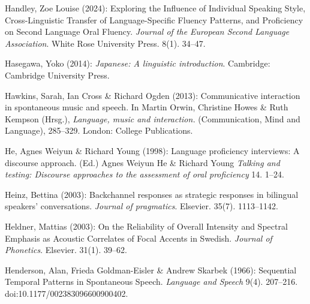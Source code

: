 \begin{styleBibliography}
Handley, Zoe Louise (2024): Exploring the Influence of Individual Speaking Style, Cross-Linguistic Transfer of Language-Specific Fluency Patterns, and Proficiency on Second Language Oral Fluency. \textit{Journal of the European Second Language Association}. White Rose University Press. 8(1). 34–47.
\end{styleBibliography}

\begin{styleBibliography}
Hasegawa, Yoko (2014): \textit{Japanese: A linguistic introduction}. Cambridge: Cambridge University Press.
\end{styleBibliography}

\begin{styleBibliography}
Hawkins, Sarah, Ian Cross \& Richard Ogden (2013): Communicative interaction in spontaneous music and speech. In Martin Orwin, Christine Howes \& Ruth Kempson (Hrsg.), \textit{Language, music and interaction.} (Communication, Mind and Language), 285–329. London: College Publications.
\end{styleBibliography}

\begin{styleBibliography}
He, Agnes Weiyun \& Richard Young (1998): Language proficiency interviews: A discourse approach. (Ed.) Agnes Weiyun He \& Richard Young \textit{Talking and testing: Discourse approaches to the assessment of oral proficiency} 14. 1–24.
\end{styleBibliography}

\begin{styleBibliography}
Heinz, Bettina (2003): Backchannel responses as strategic responses in bilingual speakers’ conversations. \textit{Journal of pragmatics}. Elsevier. 35(7). 1113–1142.
\end{styleBibliography}

\begin{styleBibliography}
Heldner, Mattias (2003): On the Reliability of Overall Intensity and Spectral Emphasis as Acoustic Correlates of Focal Accents in Swedish. \textit{Journal of Phonetics}. Elsevier. 31(1). 39–62.
\end{styleBibliography}

\begin{styleBibliography}
Henderson, Alan, Frieda Goldman-Eisler \& Andrew Skarbek (1966): Sequential Temporal Patterns in Spontaneous Speech. \textit{Language and Speech} 9(4). 207–216. doi:10.1177/002383096600900402.
\end{styleBibliography}

